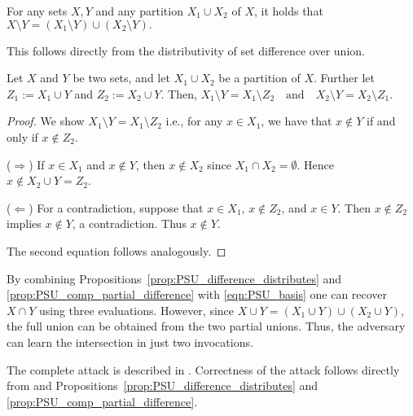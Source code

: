 \begin{prop}\label{prop:PSU_difference_distributes}
For any sets $X, Y$ and any partition $X_1 \cup X_2$ of $X$, it holds that
$X \setminus Y = (X_1 \setminus Y) \cup (X_2 \setminus Y).$
\end{prop}

This follows directly from the distributivity of set difference over union.

\begin{prop}\label{prop:PSU_comp_partial_difference}
Let $X$ and $Y$ be two sets, and let $X_1 \cup X_2$ be a partition of $X$.
Further let $Z_1 := X_1 \cup Y$ and $Z_2 := X_2 \cup Y$.
Then, $X_1 \setminus Y = X_1 \setminus Z_2 \quad \text{and} \quad X_2 \setminus Y = X_2 \setminus Z_1.$
\end{prop}
\begin{proof}
We show $X_1 \setminus Y = X_1 \setminus Z_2$ i.e.,
for any $x \in X_1$, we have that $x \notin Y$ if and only if $x \notin Z_2$. 

($\Rightarrow$)  
If $x \in X_1$ and $x \notin Y$, then $x \notin X_2$ since $X_1 \cap X_2 = \emptyset$.  
Hence $x \notin X_2 \cup Y = Z_2$.

($\Leftarrow$)  
For a contradiction, suppose that $x \in X_1$, $x \notin Z_2$, and $x \in Y$. Then $x \notin Z_2$ implies $x \notin Y$, a contradiction.  
Thus $x \notin Y$.

The second equation follows analogously.
\end{proof}


By combining Propositions~\ref{prop:PSU_difference_distributes} and \ref{prop:PSU_comp_partial_difference} with \cref{eqn:PSU_basis} one can recover 
$X\cap Y$ using three \PSU{} evaluations.
However, since $X \cup Y = (X_1 \cup Y) \cup (X_2 \cup Y)$, the full union can be obtained from the two partial unions. Thus, the adversary can learn the intersection in just two \PSU{} invocations. 

The complete attack \PSUattack{} is described in . Correctness of the attack follows directly from  and Propositions~\ref{prop:PSU_difference_distributes} and \ref{prop:PSU_comp_partial_difference}.

